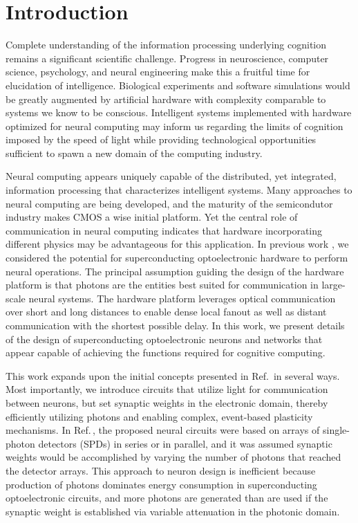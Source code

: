 \documentclass[aip,amsmath,amssymb,reprint,nofootinbib]{revtex4-1}
\begin{document}
\section{\label{sec:introduction}Introduction}
Complete understanding of the information processing underlying cognition remains a significant scientific challenge. Progress in neuroscience, computer science, psychology, and neural engineering make this a fruitful time for elucidation of intelligence. Biological experiments and software simulations would be greatly augmented by artificial hardware with complexity comparable to systems we know to be conscious. Intelligent systems implemented with hardware optimized for neural computing may inform us regarding the limits of cognition imposed by the speed of light while providing technological opportunities sufficient to spawn a new domain of the computing industry.

Neural computing appears uniquely capable of the distributed, yet integrated, information processing that characterizes intelligent systems. Many approaches to neural computing are being developed, and the maturity of the semicondutor industry makes CMOS a wise initial platform. Yet the central role of communication in neural computing indicates that hardware incorporating different physics may be advantageous for this application. In previous work \cite{shbu2017}, we considered the potential for superconducting optoelectronic hardware to perform neural operations. The principal assumption guiding the design of the hardware platform is that photons are the entities best suited for communication in large-scale neural systems. The hardware platform leverages optical communication over short and long distances to enable dense local fanout as well as distant communication with the shortest possible delay. In this work, we present details of the design of superconducting optoelectronic neurons and networks that appear capable of achieving the functions required for cognitive computing. 

This work expands upon the initial concepts presented in Ref.\, in several ways. Most importantly, we introduce circuits that utilize light for communication between neurons, but set synaptic weights in the electronic domain, thereby efficiently utilizing photons and enabling complex, event-based plasticity mechanisms. In Ref.\,, the proposed neural circuits were based on arrays of single-photon detectors (SPDs) in series or in parallel, and it was assumed synaptic weights would be accomplished by varying the number of photons that reached the detector arrays. This approach to neuron design is inefficient because production of photons dominates energy consumption in superconducting optoelectronic circuits, and more photons are generated than are used if the synaptic weight is established via variable attenuation in the photonic domain. 
\end{document}
